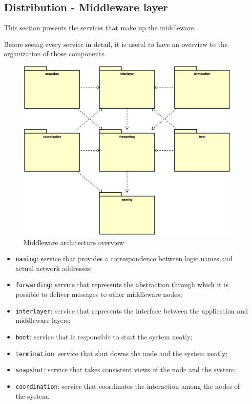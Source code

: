 \subsection{Distribution - Middleware layer}
This section presents the services that make up the middleware.

Before seeing every service in detail, it is useful to have an overview to the
organization of those components.

\begin{figure}[H]
  \centering
  \includegraphics[width=\columnwidth]{images/solution/mw/overview.eps}
  \caption{Middleware architecture overview}
  \label{fig:mw-arch-over}
\end{figure} %

\begin{itemize}
  \item \texttt{naming}: service that provides a correspondence between logic
    names and actual network addresses;
  \item \texttt{forwarding}: service that represents the abstraction through
    which it is possible to deliver messages to other middleware nodes;
  \item \texttt{interlayer}: service that represents the interface between
    the application and middleware layers;
  \item \texttt{boot}: service that is responsible to start the system neatly;
  \item \texttt{termination}: service that shut downs the node and the system
    neatly;
  \item \texttt{snapshot}: service that takes consistent views of the node and
    the system;
  \item \texttt{coordination}: service that coordinates the interaction among
    the nodes of the system.
\end{itemize}

